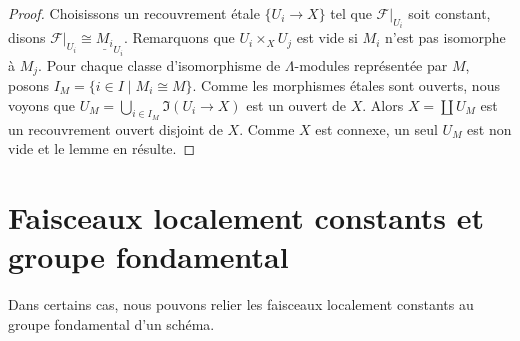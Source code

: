 \begin{proof}
Choisissons un recouvrement \'etale
$\{U_i \to X\}$ tel que $\mathcal{F}|_{U_i}$ soit constant, disons
$\mathcal{F}|_{U_i} \cong \underline{M_i}_{U_i}$.
Remarquons que $U_i \times_X U_j$ est vide si $M_i$ n'est pas isomorphe
\`a $M_j$.
Pour chaque classe d'isomorphisme de $\Lambda$-modules repr\'esent\'ee par $M$, posons $I_M = \{i \in I \mid M_i \cong M\}$.
Comme les morphismes \'etales sont ouverts, nous voyons que
$U_M = \bigcup_{i \in I_M} \Im(U_i \to X)$
est un ouvert de $X$. Alors $X = \coprod U_M$ est un recouvrement
ouvert disjoint de $X$. Comme $X$ est connexe, un seul $U_M$ est non vide
et le lemme en r\'esulte.
\end{proof}






\section{Faisceaux localement constants et groupe fondamental}
\label{section-pione}

\noindent
Dans certains cas, nous pouvons relier les faisceaux localement constants
au groupe fondamental d'un sch\'ema.


